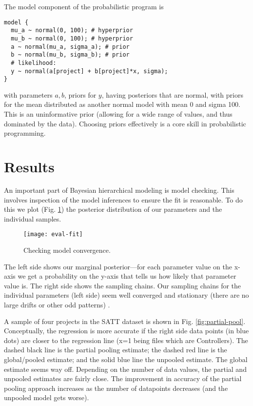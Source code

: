 \documentclass[sigconf,natbib=false]{acmart}
\begin{document}
The model component of the probabilistic program is 
\begin{verbatim}
model {
  mu_a ~ normal(0, 100); # hyperprior
  mu_b ~ normal(0, 100); # hyperprior
  a ~ normal(mu_a, sigma_a); # prior
  b ~ normal(mu_b, sigma_b); # prior
  # likelihood:
  y ~ normal(a[project] + b[project]*x, sigma); 
}
\end{verbatim}

with parameters $a,b$, priors for $y$, having posteriors that are normal, with
priors for the mean distributed as another normal model with mean 0 and sigma
100. This is an uninformative prior (allowing for a wide range of values, and
thus dominated by the data). Choosing priors effectively is a core skill in
probabilistic programming. 

\section{Results} 
An important part of Bayesian hierarchical modeling is model checking. This
involves inspection of the model inferences to ensure the fit is
reasonable. To do this we plot (Fig. \ref{fig:modelcheck}) the posterior distribution of our parameters and
the individual samples.

\begin{figure}[tb]
	\centering
	\texttt{[image: eval-fit]}
	\caption{Checking model convergence.}
	\label{fig:modelcheck}
\end{figure}

The left side shows our marginal posterior---for each parameter value on the
x-axis we get a probability on the y-axis that tells us how likely that
parameter value is. The right side shows the sampling chains. Our sampling
chains for the individual parameters (left side) seem well converged and
stationary (there are no large drifts or other odd patterns) \cite{Sorensen16}.


A sample of four projects in the SATT dataset is shown in Fig.
\ref{fig:partial-pool}. Conceptually, the regression is more accurate if the
right side data points (in blue dots) are closer to the regression line (x=1
being files which are Controllers). The dashed black line is the partial pooling
estimate; the dashed red line is the global/pooled estimate; and the solid blue
line the unpooled estimate. The global estimate seems way off. Depending on the
number of data values, the partial and unpooled estimates are fairly close. The
improvement in accuracy of the partial pooling approach increases as the number
of datapoints decreases (and the unpooled model gets worse). 
\end{document}
